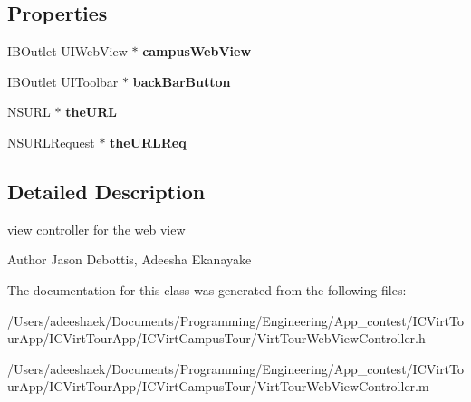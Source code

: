 \subsection*{Properties}
\begin{DoxyCompactItemize}
\item 
\hypertarget{interface_virt_tour_web_view_controller_a1844990d9d4d53de7d84892adbf43962}{I\-B\-Outlet U\-I\-Web\-View $\ast$ {\bfseries campus\-Web\-View}}\label{interface_virt_tour_web_view_controller_a1844990d9d4d53de7d84892adbf43962}

\item 
\hypertarget{interface_virt_tour_web_view_controller_a4cb80f7cc7004ebe21148599e55a8414}{I\-B\-Outlet U\-I\-Toolbar $\ast$ {\bfseries back\-Bar\-Button}}\label{interface_virt_tour_web_view_controller_a4cb80f7cc7004ebe21148599e55a8414}

\item 
\hypertarget{interface_virt_tour_web_view_controller_a4b40211f829b18cae679c0fb0c760cc7}{N\-S\-U\-R\-L $\ast$ {\bfseries the\-U\-R\-L}}\label{interface_virt_tour_web_view_controller_a4b40211f829b18cae679c0fb0c760cc7}

\item 
\hypertarget{interface_virt_tour_web_view_controller_a1747a2b99564aed6e6f6df6a35549dcd}{N\-S\-U\-R\-L\-Request $\ast$ {\bfseries the\-U\-R\-L\-Req}}\label{interface_virt_tour_web_view_controller_a1747a2b99564aed6e6f6df6a35549dcd}

\end{DoxyCompactItemize}


\subsection{Detailed Description}
view controller for the web view 

\begin{DoxyAuthor}{Author}
Jason Debottis, Adeesha Ekanayake 
\end{DoxyAuthor}


The documentation for this class was generated from the following files\-:\begin{DoxyCompactItemize}
\item 
/\-Users/adeeshaek/\-Documents/\-Programming/\-Engineering/\-App\-\_\-contest/\-I\-C\-Virt\-Tour\-App/\-I\-C\-Virt\-Tour\-App/\-I\-C\-Virt\-Campus\-Tour/Virt\-Tour\-Web\-View\-Controller.\-h\item 
/\-Users/adeeshaek/\-Documents/\-Programming/\-Engineering/\-App\-\_\-contest/\-I\-C\-Virt\-Tour\-App/\-I\-C\-Virt\-Tour\-App/\-I\-C\-Virt\-Campus\-Tour/Virt\-Tour\-Web\-View\-Controller.\-m\end{DoxyCompactItemize}
